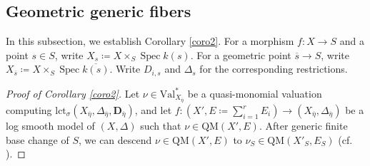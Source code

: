 \documentclass[a4paper,12pt]{amsart}
\theoremstyle{plain}
\theoremstyle{definition}
\numberwithin{equation}{section}
\def\Spec{\operatorname{Spec}}
\begin{document}
\subsection{Geometric generic fibers}\label{subsect-ggf}
In this subsection, we establish Corollary \ref{coro2}. For a morphism $f\colon X\to S$ and a point $s\in S$, write $X_s\coloneqq X\times_S \Spec k(s)$. For a geometric point $\overline{s}\to S$, write $X_{\overline{s}}\coloneqq X\times_{S} \Spec \overline{k(s)}$.  Write $D_{i,s}$ and $\Delta_s$ for the corresponding restrictions.

\begin{proof}[Proof of Corollary \ref{coro2}]
Let $\nu\in \mathrm{Val}^*_{X_{\overline{\eta}}}$ be a quasi-monomial valuation computing $\mathrm{lct}_{\sigma}(X_{\overline{\eta}},\Delta_{\overline{\eta}},\mathbf{D}_{\overline{\eta}})$, and let $f\colon \left(X',E\coloneqq \sum^r_{i=1} E_i\right)\to (X_{\overline{\eta}},\Delta_{\overline{\eta}})$ be a log smooth model of $(X,\Delta)$ such that $\nu\in \mathrm{QM}(X',E)$. After generic finite base change of $S$, we can descend $\nu\in \mathrm{QM}(X',E)$ to $\nu_S\in \mathrm{QM}(X'_S,E_S)$ (cf. \cite[Remark 2.8]{KL25}).


\end{proof}
\end{document}

